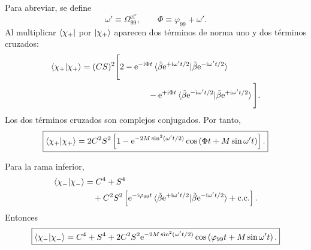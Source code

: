\documentclass[11pt]{article}
\newcommand{\ii}{\mathrm{i}}
\newcommand{\ee}{\mathrm{e}}
\begin{document}
Para abreviar, se define
\begin{equation}
  \omega'
  \equiv
  \Omega_{99}^{\mathrm{ef}\prime},
  \qquad
  \Phi
  \equiv
  \varphi_{99}+\omega'.
\end{equation}
Al multiplicar $\bra{\chi_+}$ por $\ket{\chi_+}$ aparecen dos t\'erminos de
norma uno y dos t\'erminos cruzados:
\begin{align}
  \braket{\chi_+|\chi_+}
  &=(CS)^2
  \Bigg[
  2
  -
  \ee^{-\ii\Phi t}
  \braket{
  \tilde\beta\ee^{+\ii\omega't/2}
  |
  \tilde\beta\ee^{-\ii\omega't/2}}
  \notag\\
  &\hspace{2.8cm}
  -
  \ee^{+\ii\Phi t}
  \braket{
  \tilde\beta\ee^{-\ii\omega't/2}
  |
  \tilde\beta\ee^{+\ii\omega't/2}}
  \Bigg].
\end{align}
Los dos t\'erminos cruzados son complejos conjugados. Por tanto,
\begin{equation}
  \boxed{
  \braket{\chi_+|\chi_+}
  =
  2C^2S^2
  \left[
  1-
  \ee^{-2M\sin^2(\omega't/2)}
  \cos\left(
  \Phi t+M\sin\omega't
  \right)
  \right].
  }
\end{equation}

Para la rama inferior,
\begin{align}
  \braket{\chi_-|\chi_-}
  &=
  C^4+S^4
  \notag\\
  &\quad+
  C^2S^2
  \left[
  \ee^{-\ii\varphi_{99}t}
  \braket{
  \tilde\beta\ee^{+\ii\omega't/2}
  |
  \tilde\beta\ee^{-\ii\omega't/2}}
  +\text{c.c.}
  \right].
\end{align}
Entonces
\begin{equation}
  \boxed{
  \braket{\chi_-|\chi_-}
  =
  C^4+S^4
  +
  2C^2S^2
  \ee^{-2M\sin^2(\omega't/2)}
  \cos\left(
  \varphi_{99}t+M\sin\omega't
  \right).
  }
\end{equation}
\end{document}
